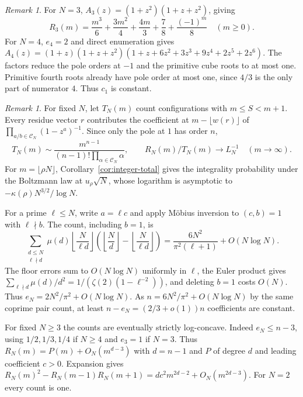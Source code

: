 \documentclass[11pt]{amsart}
\theoremstyle{remark}
\newtheorem{remark}[theorem]{Remark}
\newcommand{\CN}{\mathcal C_N}
\begin{document}
\begin{remark}\label{ex:fixed-small}
For \(N=3\), \(A_3(z)=(1+z^2)(1+z+z^2)\), giving
\[
 R_3(m)=\frac{m^3}{6}+\frac{3m^2}{4}+\frac{4m}{3}+
        \frac78+\frac{(-1)^m}{8}\quad(m\ge0).
\]
For \(N=4\), \(e_4=2\) and direct enumeration gives
\(A_4(z)=(1+z)(1+z+z^2)(1+z+6z^2+3z^3+9z^4+2z^5+2z^6)\).
The factors reduce the pole orders at \(-1\) and the primitive
cube roots to at most one. Primitive fourth roots already have pole
order at most one,
since \(4/3\) is the only part of numerator \(4\). Thus \(c_1\) is constant.
\end{remark}

\begin{remark}\label{rem:fixed-comparison}
For fixed \(N\), let \(T_N(m)\) count configurations with \(m\le S<m+1\).
Every residue vector \(r\) contributes the coefficient at
\(m-\lfloor w(r)\rfloor\) of \(\prod_{a/b\in\CN}(1-z^a)^{-1}\).
Since only the pole at \(1\) has order \(n\),
\[
 T_N(m)\sim\frac{m^{n-1}}{(n-1)!\prod_{\alpha\in\CN}\alpha},\qquad
 R_N(m)/T_N(m)\longrightarrow L_N^{-1}\quad(m\to\infty).
\]
For \(m=\lfloor\rho N\rfloor\), Corollary~\ref{cor:integer-total}
gives the integrality probability under the Boltzmann law at
\(u_\rho\sqrt N\), whose logarithm is asymptotic to
\(-\kappa(\rho)N^{3/2}/\log N\).

For a prime \(\ell\le N\), write \(a=\ell c\) and apply M\"obius inversion
to \((c,b)=1\) with \(\ell\nmid b\). The count, including \(b=1\), is
\[
 \sum_{\substack{d\le N\\ \ell\nmid d}}\mu(d)
  \left\lfloor\frac{N}{\ell d}\right\rfloor
  \left(\left\lfloor\frac Nd\right\rfloor-\left\lfloor\frac{N}{\ell d}\right\rfloor\right)
 =\frac{6N^2}{\pi^2(\ell+1)}+O(N\log N).
\]
The floor errors sum to \(O(N\log N)\) uniformly in \(\ell\), the
Euler product gives \(\sum_{\ell\nmid d}\mu(d)/d^2=
1/(\zeta(2)(1-\ell^{-2}))\), and deleting \(b=1\) costs \(O(N)\).
Thus \(e_N=2N^2/\pi^2+O(N\log N)\). As \(n=6N^2/\pi^2+O(N\log N)\)
by the same coprime pair count, at least
\(n-e_N=(2/3+o(1))n\) coefficients are constant.

For fixed \(N\ge3\) the counts are eventually strictly log-concave.
Indeed \(e_N\le n-3\), using \(1/2,1/3,1/4\) if \(N\ge4\) and \(e_3=1\) if \(N=3\). Thus \(R_N(m)=P(m)+O_N(m^{d-3})\) with
\(d=n-1\) and \(P\) of degree \(d\) and leading coefficient \(c>0\).
Expansion gives
\(R_N(m)^2-R_N(m-1)R_N(m+1)=dc^2m^{2d-2}+O_N(m^{2d-3})\).
For \(N=2\) every count is one.
\end{remark}
\end{document}
